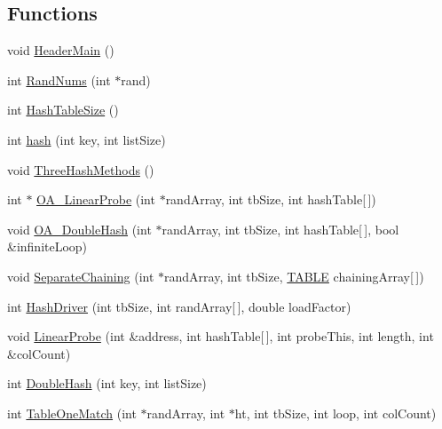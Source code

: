 \subsection*{Functions}
\begin{DoxyCompactItemize}
\item 
void \hyperlink{_bradshaw-_mansfield-_assn2-_d_l_l_prog_8cpp_ad0ff1b56e8aa2267183dc975be2704c3}{HeaderMain} ()
\item 
int \hyperlink{_bradshaw-_mansfield-_assn2-_d_l_l_prog_8cpp_ad94bb5a370d4b069f44ced20f3b6d5a3}{RandNums} (int $\ast$rand)
\item 
int \hyperlink{_bradshaw-_mansfield-_assn2-_d_l_l_prog_8cpp_a0ab6301502b50757d27084788bab0db3}{HashTableSize} ()
\item 
int \hyperlink{_bradshaw-_mansfield-_assn2-_d_l_l_prog_8cpp_ab771aabb4158e3dd9454ff4ff13b0f26}{hash} (int key, int listSize)
\item 
void \hyperlink{_bradshaw-_mansfield-_assn2-_d_l_l_prog_8cpp_ac4885dc21b261220f2a030b1ad06aec5}{ThreeHashMethods} ()
\item 
int $\ast$ \hyperlink{_bradshaw-_mansfield-_assn2-_d_l_l_prog_8cpp_ad71094eda822fabc884e72034ac71ddb}{OA\_\-LinearProbe} (int $\ast$randArray, int tbSize, int hashTable\mbox{[}$\,$\mbox{]})
\item 
void \hyperlink{_bradshaw-_mansfield-_assn2-_d_l_l_prog_8cpp_a6d73bd0a60e0c71b3df387a63804a083}{OA\_\-DoubleHash} (int $\ast$randArray, int tbSize, int hashTable\mbox{[}$\,$\mbox{]}, bool \&infiniteLoop)
\item 
void \hyperlink{_bradshaw-_mansfield-_assn2-_d_l_l_prog_8cpp_a3c6053c6e80957893d4a9bb2bb0dc221}{SeparateChaining} (int $\ast$randArray, int tbSize, \hyperlink{struct_t_a_b_l_e}{TABLE} chainingArray\mbox{[}$\,$\mbox{]})
\item 
int \hyperlink{_bradshaw-_mansfield-_assn2-_d_l_l_prog_8cpp_abf8c6f979d24b6a41d414e10d7a78a60}{HashDriver} (int tbSize, int randArray\mbox{[}$\,$\mbox{]}, double loadFactor)
\item 
void \hyperlink{_bradshaw-_mansfield-_assn2-_d_l_l_prog_8cpp_aac1d295acb5e8624df95e8f24fcf39cc}{LinearProbe} (int \&address, int hashTable\mbox{[}$\,$\mbox{]}, int probeThis, int length, int \&colCount)
\item 
int \hyperlink{_bradshaw-_mansfield-_assn2-_d_l_l_prog_8cpp_aba56e572dc851c7863847efa4a3a1f22}{DoubleHash} (int key, int listSize)
\item 
int \hyperlink{_bradshaw-_mansfield-_assn2-_d_l_l_prog_8cpp_a87dd150179c3fb31ca21d41ca49dd23d}{TableOneMatch} (int $\ast$randArray, int $\ast$ht, int tbSize, int loop, int colCount)

\end{DoxyCompactItemize}
